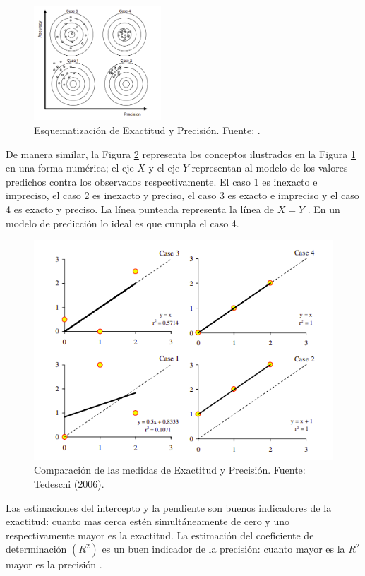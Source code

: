 \begin{figure}[H]
	\centering
	\includegraphics[width=180px]{img/tadeshi_casos.png}
	\caption{Esquematización de Exactitud y Precisión. Fuente: \textcite{tedeschi-2006}.}
	\label{fig:EsquemaExacPreci}
\end{figure}
\FloatBarrier

De manera similar, la Figura \ref{fig:ComparmedidExacPreci} representa los conceptos ilustrados en la Figura \ref{fig:EsquemaExacPreci} en una forma numérica; el eje $X$ y el eje $Y$ representan al modelo de los valores predichos contra los observados respectivamente. El caso 1 es inexacto e impreciso, el caso 2 es inexacto y preciso, el caso 3 es exacto e impreciso y el caso 4 es exacto y preciso. La línea punteada representa la línea de $X = Y$ . En un modelo de predicción lo ideal es que cumpla el caso 4. 

\begin{figure}[H]
	\centering
	\includegraphics[width=0.6\linewidth]{img/tedeshi_casos_2.png}
	\caption{ Comparación de las medidas de Exactitud y Precisión. Fuente: Tedeschi (2006).}
	\label{fig:ComparmedidExacPreci}
\end{figure}
\FloatBarrier

Las estimaciones del intercepto y la pendiente son buenos indicadores de la exactitud: cuanto mas cerca
estén simultáneamente de cero y uno respectivamente mayor es la exactitud. La estimación del coeficiente de
determinación $(R^{2})$ es un buen indicador de la precisión: cuanto mayor es la $R^{2}$ mayor es la precisión \parencite{balam-2012}.\\

